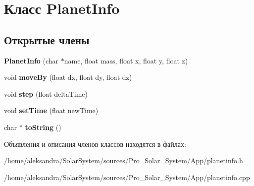 \hypertarget{classPlanetInfo}{\section{Класс Planet\-Info}
\label{classPlanetInfo}
}
\subsection*{Открытые члены}
\begin{DoxyCompactItemize}
\item 
\hypertarget{classPlanetInfo_a2900bc688f736551058c697f731dc5c5}{{\bfseries Planet\-Info} (char $\ast$name, float mass, float x, float y, float z)}\label{classPlanetInfo_a2900bc688f736551058c697f731dc5c5}

\item 
\hypertarget{classPlanetInfo_ac6c1ba879c2083997c7c7133796be2eb}{void {\bfseries move\-By} (float dx, float dy, float dz)}\label{classPlanetInfo_ac6c1ba879c2083997c7c7133796be2eb}

\item 
\hypertarget{classPlanetInfo_a7106258706c2019d888292b88f94bd5a}{void {\bfseries step} (float delta\-Time)}\label{classPlanetInfo_a7106258706c2019d888292b88f94bd5a}

\item 
\hypertarget{classPlanetInfo_a0ffe83ebd9e74b8de900c49fa2b892af}{void {\bfseries set\-Time} (float new\-Time)}\label{classPlanetInfo_a0ffe83ebd9e74b8de900c49fa2b892af}

\item 
\hypertarget{classPlanetInfo_a054f305913b26b25105d9eb644c9584b}{char $\ast$ {\bfseries to\-String} ()}\label{classPlanetInfo_a054f305913b26b25105d9eb644c9584b}

\end{DoxyCompactItemize}


Объявления и описания членов классов находятся в файлах\-:\begin{DoxyCompactItemize}
\item 
/home/aleksandra/\-Solar\-System/sources/\-Pro\-\_\-\-Solar\-\_\-\-System/\-App/planetinfo.\-h\item 
/home/aleksandra/\-Solar\-System/sources/\-Pro\-\_\-\-Solar\-\_\-\-System/\-App/planetinfo.\-cpp\end{DoxyCompactItemize}
